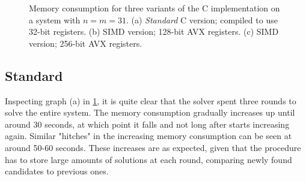 \begin{figure}[t]
    \centering
    \caption{Memory consumption for three variants of the C implementation on a system with $n = m = 31$. (a) \textit{Standard} C version; compiled to use 32-bit registers. (b) SIMD version; 128-bit AVX registers. (c) SIMD version; 256-bit AVX registers.} \label{fig:mem_dinur}
\end{figure}

\subsection{Standard}

Inspecting graph (a) in \cref{fig:mem_dinur}, it is quite clear that the solver spent three rounds to solve the entire system. The memory consumption gradually increases up until around 30 seconds, at which point it falls and not long after starts increasing again. Similar "hitches" in the increasing memory consumption can be seen at around 50-60 seconds. These increases are as expected, given that the procedure has to store large amounts of solutions at each round, comparing newly found candidates to previous ones.

